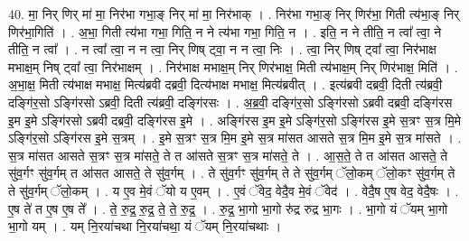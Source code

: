 \documentclass[17pt]{extarticle}
\begin{document}
40. मा॒ निर् णिर् मा॑ मा॒ निर॑भा गभा॒ङ् निर् मा॑ मा॒ निर॑भाक् । . निर॑भा गभा॒ङ् निर् णिर॑भा॒ गिती त्य॑भा॒ङ् निर् णिर॑भा॒गिति॑ । . अ॒भा॒ गिती त्य॑भा गभा॒ गिति॒ न ने त्य॑भा गभा॒ गिति॒ न । . इति॒ न ने तीति॒ न त्वा᳚ त्वा॒ ने तीति॒ न त्वा᳚ । . न त्वा᳚ त्वा॒ न न त्वा॒ निर् णिष् ट्वा॒ न न त्वा॒ निः । . त्वा॒ निर् णिष् ट्वा᳚ त्वा॒ निर॑भाक्ष मभाक्ष॒म् निष् ट्वा᳚ त्वा॒ निर॑भाक्षम् । . निर॑भाक्ष मभाक्ष॒म् निर् णिर॑भाक्ष॒ मिती त्य॑भाक्ष॒म् निर् णिर॑भाक्ष॒ मिति॑ । . अ॒भा॒क्ष॒ मिती त्य॑भाक्ष मभाक्ष॒ मित्य॑ब्रवी दब्रवी॒ दित्य॑भाक्ष मभाक्ष॒ मित्य॑ब्रवीत् । . इत्य॑ब्रवी दब्रवी॒ दिती त्य॑ब्रवी॒ दङ्गि॑र॒सो ऽङ्गि॑रसो ऽब्रवी॒ दिती त्य॑ब्रवी॒ दङ्गि॑रसः । . अ॒ब्र॒वी॒ दङ्गि॑र॒सो ऽङ्गि॑रसो ऽब्रवी दब्रवी॒ दङ्गि॑रस इ॒म इ॒मे ऽङ्गि॑रसो ऽब्रवी दब्रवी॒ दङ्गि॑रस इ॒मे । . अङ्गि॑रस इ॒म इ॒मे ऽङ्गि॑र॒सो ऽङ्गि॑रस इ॒मे स॒त्रꣳ स॒त्र मि॒मे ऽङ्गि॑र॒सो ऽङ्गि॑रस इ॒मे स॒त्रम् । . इ॒मे स॒त्रꣳ स॒त्र मि॒म इ॒मे स॒त्र मा॑सत आसते स॒त्र मि॒म इ॒मे स॒त्र मा॑सते । . स॒त्र मा॑सत आसते स॒त्रꣳ स॒त्र मा॑सते॒ ते त आ॑सते स॒त्रꣳ स॒त्र मा॑सते॒ ते । . आ॒स॒ते॒ ते त आ॑सत आसते॒ ते सु॑व॒र्गꣳ सु॑व॒र्गम् त आ॑सत आसते॒ ते सु॑व॒र्गम् । . ते सु॑व॒र्गꣳ सु॑व॒र्गम् ते ते सु॑व॒र्गम् ॅलो॒कम् ॅलो॒कꣳ सु॑व॒र्गम् ते ते सु॑व॒र्गम् ॅलो॒कम् । . य ए॒व मे॒वं ॅयो य ए॒वम् । . ए॒वं ॅवेद॒ वेदै॒व मे॒वं ॅवेद॑ । . वेदै॒ष ए॒ष वेद॒ वेदै॒षः । . ए॒ष ते॑ त ए॒ष ए॒ष ते᳚ । . ते॒ रु॒द्र॒ रु॒द्र॒ ते॒ ते॒ रु॒द्र॒ । . रु॒द्र॒ भा॒गो भा॒गो रु॑द्र रुद्र भा॒गः । . भा॒गो यं ॅयम् भा॒गो भा॒गो यम् । . यम् नि॒रया॑चथा नि॒रया॑चथा॒ यं ॅयम् नि॒रया॑चथाः । \newline
\end{document}
